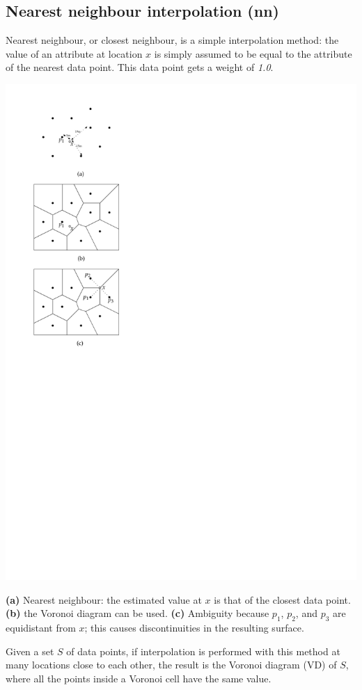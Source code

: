 \subsection{Nearest neighbour interpolation (\textbf{nn})}

Nearest neighbour, or closest neighbour, is a simple interpolation method: the value of an attribute at location $x$ is simply assumed to be equal to the attribute of the nearest data point. 
This data point gets a weight of \emph{1.0}.
\begin{marginfigure}
  \centering
  \includegraphics[width=0.8\linewidth]{figs/cn}
  \caption{\textbf{(a)} Nearest neighbour: the estimated value at $x$ is that of the closest data point. \textbf{(b)} the Voronoi diagram can be used. \textbf{(c)} Ambiguity because $p_1$, $p_2$, and $p_3$ are equidistant from $x$; this causes discontinuities in the resulting surface.}%
\end{marginfigure}
Given a set $S$ of data points, if interpolation is performed with this method at many locations close to each other, the result is the Voronoi diagram (VD) of $S$, where all the points inside a Voronoi cell have the same value.

